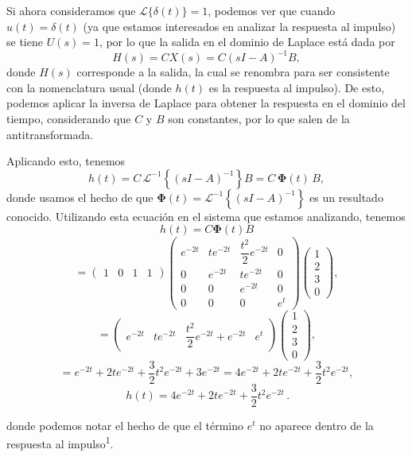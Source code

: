 \documentclass[
  11pt,
  letterpaper,
   addpoints,
   answers
  ]{exam}
\begin{document}
\begin{questions}
\begin{solution}
Si ahora consideramos que $\mathcal{L}\{\delta(t)\}=1$, podemos ver que cuando $u(t)=\delta(t)$ (ya que estamos interesados en analizar la respuesta al impulso) se tiene $U(s)=1$, por lo que la salida en el dominio de Laplace está dada por
\begin{equation}
H(s)=CX(s)=C(sI-A)^{-1}B,
\end{equation}
donde $H(s)$ corresponde a la salida, la cual se renombra para ser consistente con la nomenclatura usual (donde $h(t)$ es la respuesta al impulso). De esto, podemos aplicar la inversa de Laplace para obtener la respuesta en el dominio del tiempo, considerando que $C$ y $B$ son constantes, por lo que salen de la antitransformada.

Aplicando esto, tenemos
\begin{equation}
h(t)=C\,\mathcal{L}^{-1}\!\left\{(sI-A)^{-1}\right\}B
= C\,\bm{\Phi}(t)\,B,
\end{equation}
donde usamos el hecho de que $\bm{\Phi}(t)=\mathcal{L}^{-1}\!\left\{(sI-A)^{-1}\right\}$ es un resultado conocido. Utilizando esta ecuación en el sistema que estamos analizando, tenemos
\begin{equation}
h(t)=C\bm{\Phi}(t)B
\end{equation}
\begin{equation}
=\begin{pmatrix}1&0&1&1\end{pmatrix}
\begin{pmatrix}
e^{-2t} & t e^{-2t} & \dfrac{t^{2}}{2}e^{-2t} & 0\\
0 & e^{-2t} & t e^{-2t} & 0\\
0 & 0 & e^{-2t} & 0\\
0 & 0 & 0 & e^{t}
\end{pmatrix}
\begin{pmatrix}
1\\ 2\\ 3\\ 0
\end{pmatrix},
\end{equation}
\begin{equation}
=\begin{pmatrix}
e^{-2t} & t e^{-2t} & \dfrac{t^{2}}{2}e^{-2t}+e^{-2t} & e^{t}
\end{pmatrix}
\begin{pmatrix}
1\\ 2\\ 3\\ 0
\end{pmatrix},
\end{equation}
\begin{equation}
= e^{-2t}+2t e^{-2t}+\frac{3}{2}t^{2}e^{-2t}+3e^{-2t}
= 4e^{-2t}+2t e^{-2t}+\frac{3}{2}t^{2}e^{-2t},
\end{equation}
\begin{equation}
\boxed{\,h(t)=4e^{-2t}+2t e^{-2t}+\frac{3}{2}t^{2}e^{-2t}\,}.
\end{equation}

donde podemos notar el hecho de que el término $e^{t}$ no aparece dentro de la respuesta al impulso\textsuperscript{1}.

\end{solution}
\end{questions}
\end{document}

